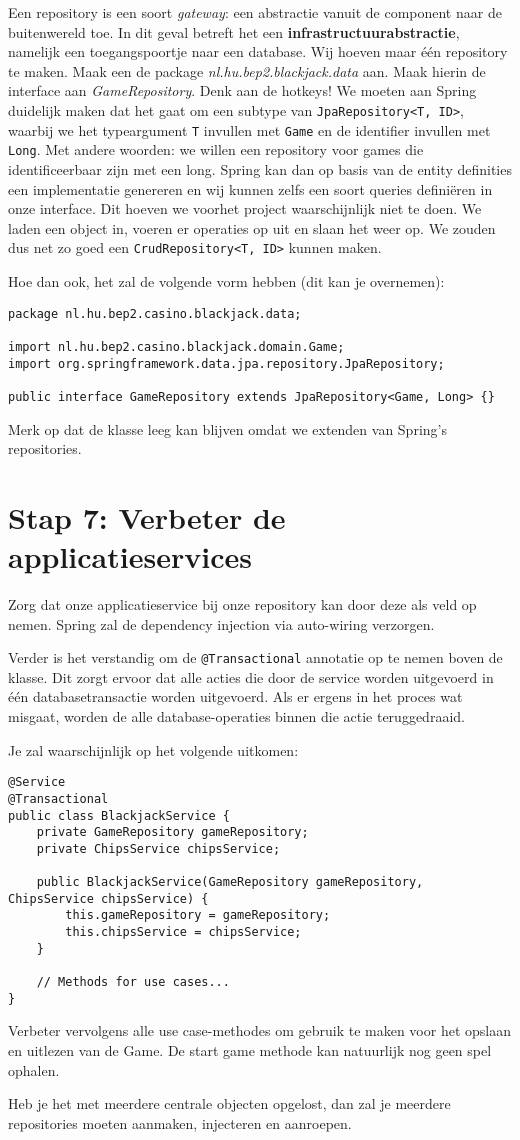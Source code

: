 \documentclass[dutch,a4paper,12pt,doubleside]{book}
\begin{document}
Een repository is een soort \textit{gateway}: een abstractie vanuit de component naar de buitenwereld toe.
In dit geval betreft het een \textbf{infrastructuurabstractie}, namelijk een toegangspoortje naar een database.
Wij hoeven maar één repository te maken. Maak een de package \textit{nl.hu.bep2.blackjack.data} aan.
Maak hierin de interface aan \textit{GameRepository}. Denk aan de hotkeys!
We moeten aan Spring duidelijk maken dat het gaat om een subtype van \texttt{JpaRepository<T, ID>},
waarbij we het typeargument \texttt{T} invullen met \texttt{Game} en de identifier invullen met \texttt{Long}.
Met andere woorden: we willen een repository voor games die identificeerbaar zijn met een long.
Spring kan dan op basis van de entity definities een implementatie genereren en wij kunnen zelfs 
een soort queries definiëren in onze interface. 
Dit hoeven we voorhet project waarschijnlijk niet te doen.
We laden een object in, voeren er operaties op uit en slaan het weer op. 
We zouden dus net zo goed een \texttt{CrudRepository<T, ID>}
kunnen maken. 

Hoe dan ook, het zal de volgende vorm hebben 
(dit kan je overnemen):
\begin{verbatim}
package nl.hu.bep2.casino.blackjack.data;

import nl.hu.bep2.casino.blackjack.domain.Game;
import org.springframework.data.jpa.repository.JpaRepository;

public interface GameRepository extends JpaRepository<Game, Long> {}
\end{verbatim}

Merk op dat de klasse leeg kan blijven omdat we extenden van Spring's repositories.

\section{Stap 7: Verbeter de applicatieservices}
Zorg dat onze applicatieservice bij onze repository kan door 
deze als veld op nemen. Spring zal de dependency injection via 
auto-wiring verzorgen.

Verder is het verstandig om de \texttt{@Transactional} annotatie 
op te nemen boven de klasse. Dit zorgt ervoor dat alle acties 
die door de service worden uitgevoerd in één databasetransactie 
worden uitgevoerd. Als er ergens in het proces wat misgaat, worden 
de alle database-operaties binnen die actie teruggedraaid.

Je zal waarschijnlijk op het volgende uitkomen:
\begin{verbatim}
@Service
@Transactional
public class BlackjackService {
    private GameRepository gameRepository;
    private ChipsService chipsService;

    public BlackjackService(GameRepository gameRepository, ChipsService chipsService) {
        this.gameRepository = gameRepository;
        this.chipsService = chipsService;
    }
    
    // Methods for use cases...
}
\end{verbatim}

Verbeter vervolgens alle use case-methodes om gebruik te maken voor het 
opslaan en uitlezen van de Game. De start game methode kan natuurlijk nog geen 
spel ophalen.

Heb je het met meerdere centrale objecten opgelost, 
dan zal je meerdere repositories moeten 
aanmaken, injecteren en aanroepen.
\end{document}
